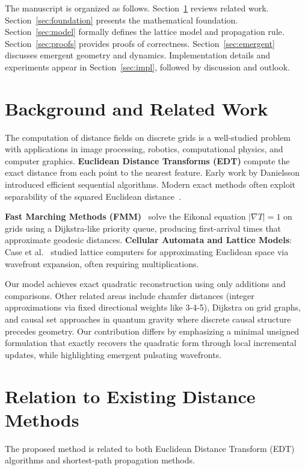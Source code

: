 \documentclass[11pt,a4paper]{article}
\begin{document}
The manuscript is organized as follows. Section~\ref{sec:background} reviews related work. Section~\ref{sec:foundation} presents the mathematical foundation. Section~\ref{sec:model} formally defines the lattice model and propagation rule. Section~\ref{sec:proofs} provides proofs of correctness. Section~\ref{sec:emergent} discusses emergent geometry and dynamics. Implementation details and experiments appear in Section~\ref{sec:impl}, followed by discussion and outlook.

\section{Background and Related Work}
\label{sec:background}

The computation of distance fields on discrete grids is a well-studied problem with applications in image processing, robotics, computational physics, and computer graphics. \textbf{Euclidean Distance Transforms (EDT)} compute the exact distance from each point to the nearest feature. Early work by Danielsson~\cite{danielsson1980} introduced efficient sequential algorithms. Modern exact methods often exploit separability of the squared Euclidean distance~\cite{felzenszwalb2012distance}.

\textbf{Fast Marching Methods (FMM)}~\cite{sethian1996} solve the Eikonal equation $|\nabla T| = 1$ on grids using a Dijkstra-like priority queue, producing first-arrival times that approximate geodesic distances. \textbf{Cellular Automata and Lattice Models}: Case et al.~\cite{case2001lattice} studied lattice computers for approximating Euclidean space via wavefront expansion, often requiring multiplications. 

Our model achieves exact quadratic reconstruction using only additions and comparisons. Other related areas include chamfer distances (integer approximations via fixed directional weights like 3-4-5), Dijkstra on grid graphs, and causal set approaches in quantum gravity where discrete causal structure precedes geometry. Our contribution differs by emphasizing a minimal unsigned formulation that exactly recovers the quadratic form through local incremental updates, while highlighting emergent pulsating wavefronts.

\section{Relation to Existing Distance Methods}
\label{sec:relation}

The proposed method is related to both Euclidean Distance Transform (EDT)
algorithms and shortest-path propagation methods.
\end{document}
